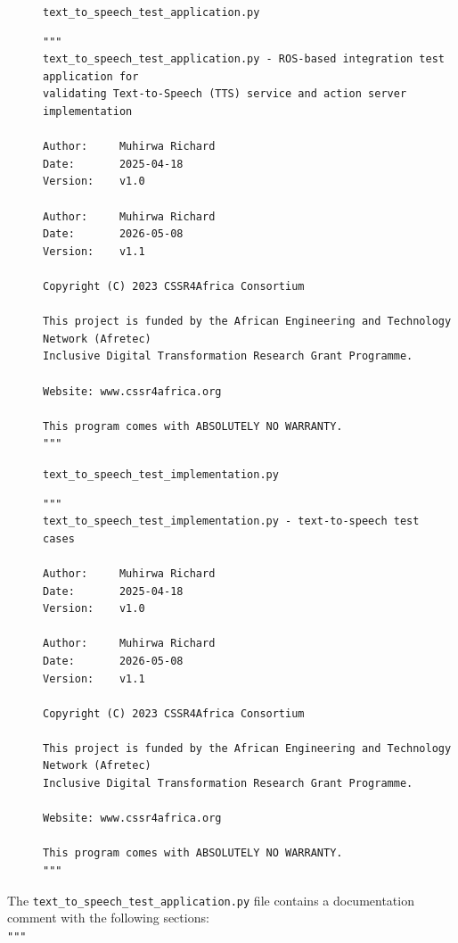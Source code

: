 \documentclass{CSSRforAfrica}
\newcommand{\checkboxChecked}{\fbox{\ding{51}}} %
\begin{document}
\begin{description}

\item[\checkboxChecked] {\small \verb+text_to_speech_test_application.py+}
{\scriptsize \begin{verbatim}
"""
text_to_speech_test_application.py - ROS-based integration test application for
validating Text-to-Speech (TTS) service and action server implementation

Author:     Muhirwa Richard
Date:       2025-04-18
Version:    v1.0

Author:     Muhirwa Richard
Date:       2026-05-08
Version:    v1.1

Copyright (C) 2023 CSSR4Africa Consortium

This project is funded by the African Engineering and Technology Network (Afretec)
Inclusive Digital Transformation Research Grant Programme.

Website: www.cssr4africa.org

This program comes with ABSOLUTELY NO WARRANTY.
"""
\end{verbatim} }

\item[\checkboxChecked] {\small \verb+text_to_speech_test_implementation.py+}
{\scriptsize \begin{verbatim}
"""
text_to_speech_test_implementation.py - text-to-speech test cases

Author:     Muhirwa Richard
Date:       2025-04-18
Version:    v1.0

Author:     Muhirwa Richard
Date:       2026-05-08
Version:    v1.1

Copyright (C) 2023 CSSR4Africa Consortium

This project is funded by the African Engineering and Technology Network (Afretec)
Inclusive Digital Transformation Research Grant Programme.

Website: www.cssr4africa.org

This program comes with ABSOLUTELY NO WARRANTY.
"""
\end{verbatim} }

\end{description}

\noindent The {\small \verb+text_to_speech_test_application.py+} file contains a documentation comment with the following sections:\\

\noindent \verb+"""+
\end{document}
